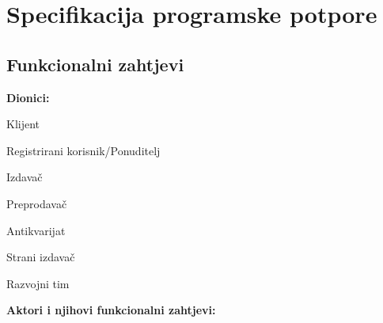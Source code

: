 \chapter{Specifikacija programske potpore}
		
	\section{Funkcionalni zahtjevi}
			
			\noindent \textbf{Dionici:}
			
			\begin{packed_enum}
				
				\item Klijent
				\item Registrirani korisnik/Ponuditelj		
				\begin{packed_enum}
                    				\item Izdavač
                    				\item Preprodavač
                   				\item Antikvarijat
                			\end{packed_enum}
                			\item Strani izdavač
                			\item Razvojni tim
			\end{packed_enum}
			
			\noindent \textbf{Aktori i njihovi funkcionalni zahtjevi:}
			
